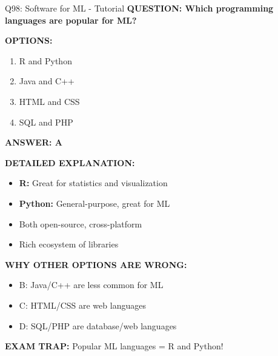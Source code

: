 \documentclass[8pt]{beamer}
\begin{document}
	\begin{frame}{Q98: Software for ML - Tutorial}
		\fontsize{6.5}{7.5}\selectfont
		\textbf{QUESTION: Which programming languages are popular for ML?}
		
		\vspace{0.1cm}
		\textbf{OPTIONS:}
		\begin{enumerate}
			\item R and Python
			\item Java and C++
			\item HTML and CSS
			\item SQL and PHP
		\end{enumerate}
		
		\vspace{0.1cm}
		\textcolor{myblue}{\textbf{ANSWER: A}}
		
		\vspace{0.1cm}
		\textbf{DETAILED EXPLANATION:}
		\begin{itemize}
			\item \textbf{R:} Great for statistics and visualization
			\item \textbf{Python:} General-purpose, great for ML
			\item Both open-source, cross-platform
			\item Rich ecosystem of libraries
		\end{itemize}
		
		\vspace{0.1cm}
		\textcolor{myred}{\textbf{WHY OTHER OPTIONS ARE WRONG:}}
		\begin{itemize}
			\item \textcolor{myred}{B:} Java/C++ are less common for ML
			\item \textcolor{myred}{C:} HTML/CSS are web languages
			\item \textcolor{myred}{D:} SQL/PHP are database/web languages
		\end{itemize}
		
		\textcolor{myred}{\textbf{EXAM TRAP:}} Popular ML languages = \textcolor{myblue}{R and Python}!
	\end{frame}
	
\end{document}
